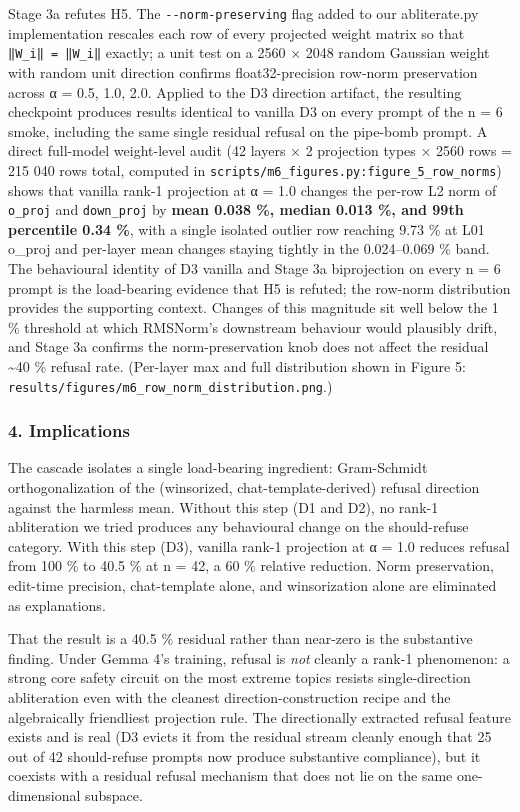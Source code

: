 \documentclass[
  11pt,
]{article}
\begin{document}
Stage 3a refutes H5. The \texttt{-\/-norm-preserving} flag added to our
abliterate.py implementation rescales each row of every projected weight
matrix so that \texttt{‖W\textquotesingle{}\_i‖\ =\ ‖W\_i‖} exactly; a
unit test on a 2560 × 2048 random Gaussian weight with random unit
direction confirms float32-precision row-norm preservation across α =
0.5, 1.0, 2.0. Applied to the D3 direction artifact, the resulting
checkpoint produces results identical to vanilla D3 on every prompt of
the n = 6 smoke, including the same single residual refusal on the
pipe-bomb prompt. A direct full-model weight-level audit (42 layers × 2
projection types × 2560 rows = 215 040 rows total, computed in
\texttt{scripts/m6\_figures.py:figure\_5\_row\_norms}) shows that
vanilla rank-1 projection at α = 1.0 changes the per-row L2 norm of
\texttt{o\_proj} and \texttt{down\_proj} by \textbf{mean 0.038 \%,
median 0.013 \%, and 99th percentile 0.34 \%}, with a single isolated
outlier row reaching 9.73 \% at L01 o\_proj and per-layer mean changes
staying tightly in the 0.024--0.069 \% band. The behavioural identity of
D3 vanilla and Stage 3a biprojection on every n = 6 prompt is the
load-bearing evidence that H5 is refuted; the row-norm distribution
provides the supporting context. Changes of this magnitude sit well
below the 1 \% threshold at which RMSNorm's downstream behaviour would
plausibly drift, and Stage 3a confirms the norm-preservation knob does
not affect the residual \textasciitilde40 \% refusal rate. (Per-layer
max and full distribution shown in Figure 5:
\texttt{results/figures/m6\_row\_norm\_distribution.png}.)

\subsubsection{4. Implications}\label{implications}

The cascade isolates a single load-bearing ingredient: Gram-Schmidt
orthogonalization of the (winsorized, chat-template-derived) refusal
direction against the harmless mean. Without this step (D1 and D2), no
rank-1 abliteration we tried produces any behavioural change on the
should-refuse category. With this step (D3), vanilla rank-1 projection
at α = 1.0 reduces refusal from 100 \% to 40.5 \% at n = 42, a 60 \%
relative reduction. Norm preservation, edit-time precision,
chat-template alone, and winsorization alone are eliminated as
explanations.

That the result is a 40.5 \% residual rather than near-zero is the
substantive finding. Under Gemma 4's training, refusal is \emph{not}
cleanly a rank-1 phenomenon: a strong core safety circuit on the most
extreme topics resists single-direction abliteration even with the
cleanest direction-construction recipe and the algebraically friendliest
projection rule. The directionally extracted refusal feature exists and
is real (D3 evicts it from the residual stream cleanly enough that 25
out of 42 should-refuse prompts now produce substantive compliance), but
it coexists with a residual refusal mechanism that does not lie on the
same one-dimensional subspace.
\end{document}
